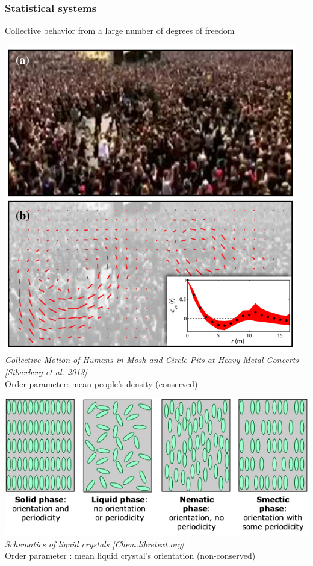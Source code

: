 \documentclass[9pt, dvipsnames,aspectratio=169]{beamer} %
\begin{document}
\begin{frame}
    \frametitle{Statistical systems}
    Collective behavior from a large number of degrees of freedom \\
    \begin{overprint}
	    \centering
	    \includegraphics[scale=0.3]{mosh-pit.png} \\
	    {\it Collective Motion of Humans in Mosh and Circle Pits at Heavy Metal Concerts [Silverberg et al. 2013]} \\[0.5cm]
	    Order parameter: mean people's density (conserved)
	    
	    \centering
	   \includegraphics[width=0.8\linewidth]{nematic-smectic.jpg} \\
	   {\it Schematics of liquid crystals [Chem.libretext.org] }\\
	   Order parameter : mean liquid crystal's orientation (non-conserved)
   \end{overprint}
\end{frame}
\end{document}
